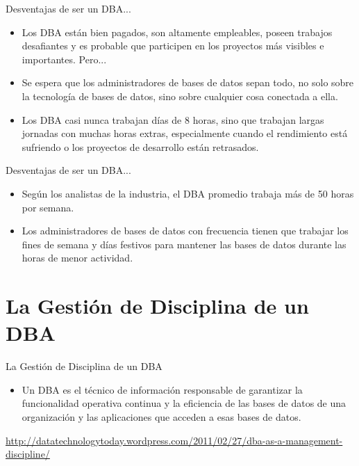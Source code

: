 \documentclass{beamer}
\newcommand{\toRight}[1]{
    \begin{FlushRight}
        {\tiny #1}
    \end{FlushRight}
}
\begin{document}
\begin{frame}{Desventajas de ser un DBA...}
    \begin{itemize}
        \item Los DBA están bien pagados, son altamente empleables, poseen trabajos desafiantes y es probable que participen en los proyectos más visibles e importantes. Pero...
        \item Se espera que los administradores de bases de datos sepan todo, no solo sobre la tecnología de bases de datos, sino sobre cualquier cosa conectada a ella. 
        \item Los DBA casi nunca trabajan días de 8 horas, sino que trabajan largas jornadas con muchas horas extras, especialmente cuando el rendimiento está sufriendo o los proyectos de desarrollo están retrasados. 
    \end{itemize}
\end{frame}


\begin{frame}{Desventajas de ser un DBA...}
    \begin{itemize}
        \item Según los analistas de la industria, el DBA promedio trabaja más de 50 horas por semana.
        \item Los administradores de bases de datos con frecuencia tienen que trabajar los fines de semana y días festivos para mantener las bases de datos durante las horas de menor actividad.
    \end{itemize}
\end{frame}

\section{La Gestión de Disciplina de un DBA}

\begin{frame}{La Gestión de Disciplina de un DBA}
    \begin{itemize}
        \item Un DBA es el técnico de información responsable de garantizar la funcionalidad operativa continua y la eficiencia de las bases de datos de una organización y las aplicaciones que acceden a esas bases de datos.
    \end{itemize}
    
    \toRight{\url{http://datatechnologytoday.wordpress.com/2011/02/27/dba-as-a-management-discipline/}}
\end{frame}
\end{document}
